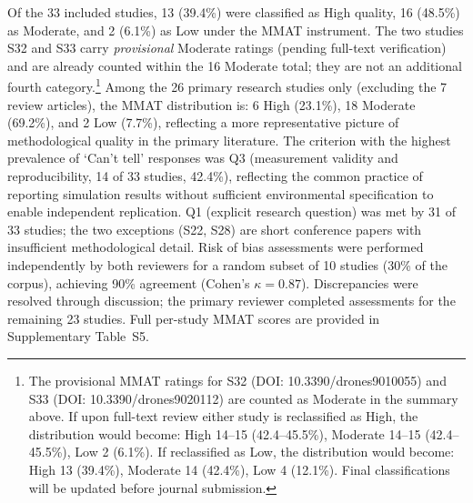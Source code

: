 \documentclass[review,3p,times]{elsarticle}
\begin{document}
Of the 33 included studies, 13 (39.4\%) were classified as High quality, 16 (48.5\%) as Moderate, and 2 (6.1\%) as Low under the MMAT instrument. The two studies S32 and S33 carry \textit{provisional} Moderate ratings (pending full-text verification) and are already counted within the 16 Moderate total; they are not an additional fourth category.\footnote{The provisional MMAT ratings for S32 (DOI: 10.3390/drones9010055) and S33 (DOI: 10.3390/drones9020112) are counted as Moderate in the summary above. If upon full-text review either study is reclassified as High, the distribution would become: High 14--15 (42.4--45.5\%), Moderate 14--15 (42.4--45.5\%), Low 2 (6.1\%). If reclassified as Low, the distribution would become: High 13 (39.4\%), Moderate 14 (42.4\%), Low 4 (12.1\%). Final classifications will be updated before journal submission.} Among the 26 primary research studies only (excluding the 7 review articles), the MMAT distribution is: 6 High (23.1\%), 18 Moderate (69.2\%), and 2 Low (7.7\%), reflecting a more representative picture of methodological quality in the primary literature. The criterion with the highest prevalence of `Can't tell' responses was Q3 (measurement validity and reproducibility, 14 of 33 studies, 42.4\%), reflecting the common practice of reporting simulation results without sufficient environmental specification to enable independent replication. Q1 (explicit research question) was met by 31 of 33 studies; the two exceptions (S22, S28) are short conference papers with insufficient methodological detail. Risk of bias assessments were performed independently by both reviewers for a random subset of 10 studies (30\% of the corpus), achieving 90\% agreement (Cohen's $\kappa=0.87$). Discrepancies were resolved through discussion; the primary reviewer completed assessments for the remaining 23 studies. Full per-study MMAT scores are provided in Supplementary Table~S5.
\end{document}

